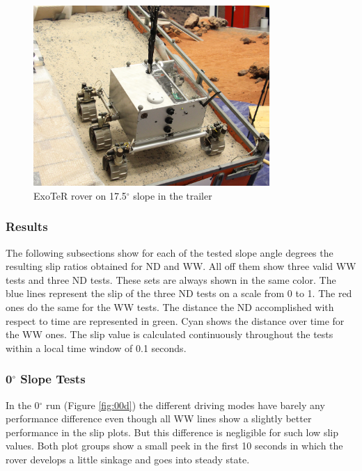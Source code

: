 \documentclass[a4paper,twocolumn]{esapub2005} %
\begin{document}
\begin{figure}[t!]
    \centering
    \includegraphics[width=0.8\textwidth]{Exoslope.jpg}
    \caption{ExoTeR rover on 17.5$^{\circ}$ slope in the trailer}
    \label{fig:Exoslope}
\end{figure}

\subsubsection{Results} 
The following subsections show for each of the tested slope angle degrees the
resulting slip ratios obtained for ND and WW. All off them show three valid WW
tests and three ND tests. These sets are always shown in the same color. The
blue lines represent the slip of the three ND tests on a scale from 0 to 1. The
red ones do the same for the WW tests. The distance the ND accomplished with
respect to time are represented in green. Cyan shows the distance over time for
the WW ones. The slip value is calculated continuously throughout the tests
within a local time window of 0.1 seconds.

\subsubsection*{0$^{\circ}$ Slope Tests}
In the 0$^\circ$ run (Figure \ref{fig:00d}) the different driving modes have
barely any performance difference even though all WW lines show a slightly
better performance in the slip plots. But this difference is negligible for
such low slip values. Both plot groups show a small peek in the first 10
seconds in which the rover develops a little sinkage and goes into steady
state. 
\end{document}
